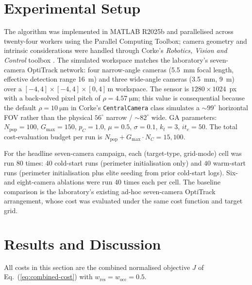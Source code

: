\documentclass[conference]{IEEEtran}
\begin{document}
\section{Experimental Setup}\label{sec:setup}
The algorithm was implemented in MATLAB R2025b and parallelised across twenty-four workers using the Parallel Computing Toolbox; camera geometry and intrinsic considerations were handled through Corke's \emph{Robotics, Vision and Control} toolbox \cite{corke_petercorkervc3-python_2026}. The simulated workspace matches the laboratory's seven-camera OptiTrack network: four narrow-angle cameras (\SI{5.5}{\mm} focal length, effective detection range \SI{16}{\m}) and three wide-angle cameras (\SI{3.5}{\mm}, \SI{9}{\m}) over a $[-4,4]\!\times\![-4,4]\!\times\![0,4]\,\text{m}$ workspace. The sensor is $1280\!\times\!1024$~px with a back-solved pixel pitch of $\rho = \SI{4.57}{\micro\metre}$; this value is consequential because the default $\rho=\SI{10}{\micro\metre}$ in Corke's \texttt{CentralCamera} class simulates a $\sim 99^\circ$ horizontal FOV rather than the physical $56^\circ$ narrow / $\sim 82^\circ$ wide. GA parameters: $N_\text{pop} = 100$, $G_\text{max} = 150$, $p_C = 1.0$, $\mu=0.5$, $\sigma=0.1$, $k_t=3$, $it_e = 50$. The total cost-evaluation budget per run is $N_\text{pop} + G_\text{max}\!\cdot\!N_C = 15{,}100$.

For the headline seven-camera campaign, each (target-type, grid-mode) cell was run $80$ times: $40$ cold-start runs (perimeter initialisation only) and $40$ warm-start runs (perimeter initialisation plus elite seeding from prior cold-start logs). Six- and eight-camera ablations were run $40$ times each per cell. The baseline comparison is the laboratory's existing ad-hoc seven-camera OptiTrack arrangement, whose cost was evaluated under the same cost function and target grid.

\section{Results and Discussion}\label{sec:results}
All costs in this section are the combined normalised objective $J$ of Eq.~(\ref{eq:combined-cost}) with $w_\text{res}=w_\text{occ}=0.5$.
\end{document}
